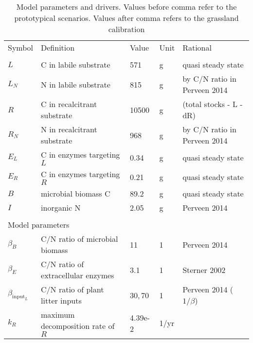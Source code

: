 % 

\begin{table}[t]
\caption{\label{tab:modelParameters}
Model parameters and drivers. Values before comma
refer to the prototypical scenarios. Values after comma refers to the
grassland calibration } \vskip4mm \centering
\begin{tabular}{lp{6cm}llp{5.5cm}}
\tophline
Symbol &  Definition & Value & Unit & Rational \\
\middlehline
\multicolumn{5}{l}{State variables}  \\
$L$ &  C in labile substrate & 571 & g & quasi steady state \\
$L_N$ &  N in labile substrate & 815 & g & by C/N ratio in Perveen 2014
\\
$R$ &  C in recalcitrant substrate & 10500 & g & \citep{Allard07} (total stocks
- L - dR)
\\
$R_N$ &  N in recalcitrant substrate & 968 & g & by C/N ratio in Perveen 2014 \\
$E_L$ &  C in enzymes targeting $L$ & 0.34 & g &  quasi steady state \\
$E_R$ &  C in enzymes targeting $R$ & 0.21 & g &  quasi steady state \\
$B$ & microbial biomass C & 89.2 & g &  quasi steady state \\
$I$ & inorganic N & 2.05 & g & Perveen 2014 \\
\\
\multicolumn{5}{l}{Model parameters}  \\
$\beta_B$ &  C/N ratio of microbial biomass & 11 & 1 & Perveen
2014 \\
$\beta_E$ &  C/N ratio of extracellular enzymes & 3.1 & 1 &
Sterner 2002 \\
$\beta_{\mathrm{input}_L}$ &  C/N ratio of plant litter inputs & 30,\,70 & 1 &
Perveen 2014 ($1/\beta$) \\
$k_R$ &  maximum decomposition rate of $R$ & 4.39e-2 & 1/yr

\end{tabular}
\end{table}
